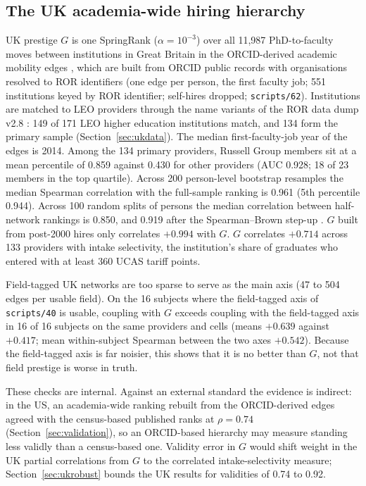 \documentclass[11pt]{article}
\newcommand{\scr}[1]{\texttt{scripts/#1}}
\begin{document}
\subsection{The UK academia-wide hiring hierarchy}\label{sec:ukprestige}

UK prestige $G$ is one SpringRank ($\alpha=10^{-3}$) over all 11,987 PhD-to-faculty moves between institutions
in Great Britain in the ORCID-derived academic mobility edges \citep[version 20260419;][]{li2026orcid}, which are
built from ORCID public records \citep{orcid} with organisations resolved to ROR identifiers (one edge per person,
the first faculty job; 551 institutions keyed by ROR identifier; self-hires dropped; \scr{62}). Institutions are
matched to LEO providers through the name variants of the ROR data dump v2.8 \citep{ror2026data}: 149 of 171 LEO
higher education institutions match, and 134 form the
primary sample (Section~\ref{sec:ukdata}). The median first-faculty-job year of the edges is 2014. Among the 134
primary providers, Russell Group members sit at a mean percentile of 0.859 against 0.430 for other providers
(AUC 0.928; 18 of 23 members in the top quartile). Across 200 person-level bootstrap resamples the median
Spearman correlation with the full-sample ranking is 0.961 (5th percentile 0.944). Across 100 random splits of
persons the median correlation between half-network rankings is 0.850, and 0.919 after the Spearman--Brown
step-up \citep{spearman1910correlation, brown1910some}. $G$ built from post-2000 hires only correlates $+0.994$ with $G$. $G$ correlates $+0.714$ across 133
providers with intake selectivity, the institution's share of graduates who entered with at least 360 UCAS
tariff points.

Field-tagged UK networks are too sparse to serve as the main axis (47 to 504 edges per usable field). On the 16
subjects where the field-tagged axis of \scr{40} is usable, coupling with $G$ exceeds coupling with the
field-tagged axis in 16 of 16 subjects on the same providers and cells (means $+0.639$ against $+0.417$; mean
within-subject Spearman between the two axes $+0.542$). Because the field-tagged axis is far noisier, this shows
that it is no better than $G$, not that field prestige is worse in truth.

These checks are internal. Against an external standard the evidence is indirect: in the US, an academia-wide
ranking rebuilt from the ORCID-derived edges agreed with the census-based published ranks at $\rho=0.74$
(Section~\ref{sec:validation}), so an ORCID-based hierarchy may measure standing less validly than a
census-based one. Validity error in $G$ would shift weight in the UK partial correlations from $G$ to the
correlated intake-selectivity measure; Section~\ref{sec:ukrobust} bounds the UK results for validities of 0.74 to
0.92.
\end{document}
